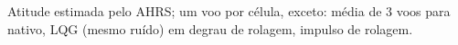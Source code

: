 Atitude estimada pelo AHRS; um voo por célula, exceto: média de 3 voos para nativo, LQG (mesmo ruído) em degrau de rolagem, impulso de rolagem.
